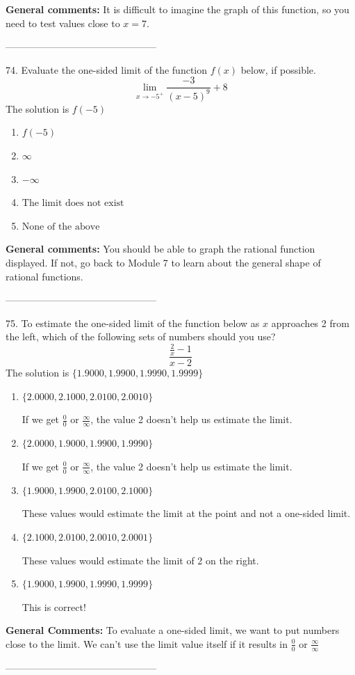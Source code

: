 \documentclass{extbook}[14pt]
\begin{document}
\textbf{General comments:} It is difficult to imagine the graph of this function, so you need to test values close to $x = 7$.

-----------------------------------------------

74. Evaluate the one-sided limit of the function $f(x)$ below, if possible.
\[ \lim_{x \rightarrow -5^+} \frac{-3}{(x-5)^9}+8 \] 
The solution is $ f(-5) $ 

\begin{enumerate}[label=\Alph*.] 
\item $ f(-5) $ 

  
\item $ \infty $ 

  
\item $ -\infty $ 

  
\item $ \text{The limit does not exist} $ 

  
\item $ \text{None of the above} $ 

  
\end{enumerate} 
 
\textbf{General comments:} You should be able to graph the rational function displayed. If not, go back to Module 7 to learn about the general shape of rational functions.

-----------------------------------------------

75. To estimate the one-sided limit of the function below as $x$ approaches 2 from the left, which of the following sets of numbers should you use?
\[ \frac{\frac{2}{x} - 1}{x - 2} \] 
The solution is $ \{ 1.9000, 1.9900, 1.9990, 1.9999 \} $ 

\begin{enumerate}[label=\Alph*.] 
\item $ \{ 2.0000, 2.1000, 2.0100, 2.0010 \} $ 

 If we get $\frac{0}{0}$ or $\frac{\infty}{\infty}$, the value 2 doesn't help us estimate the limit. 
\item $ \{ 2.0000, 1.9000, 1.9900, 1.9990 \} $ 

 If we get $\frac{0}{0}$ or $\frac{\infty}{\infty}$, the value 2 doesn't help us estimate the limit. 
\item $ \{ 1.9000, 1.9900, 2.0100, 2.1000 \} $ 

 These values would estimate the limit at the point and not a one-sided limit. 
\item $ \{ 2.1000, 2.0100, 2.0010, 2.0001 \} $ 

 These values would estimate the limit of 2 on the right. 
\item $ \{ 1.9000, 1.9900, 1.9990, 1.9999 \} $ 

 This is correct! 
\end{enumerate} 
 
\textbf{General Comments:} To evaluate a one-sided limit, we want to put numbers close to the limit. We can't use the limit value itself if it results in $\frac{0}{0}$ or $\frac{\infty}{\infty}$

-----------------------------------------------
\end{document}
